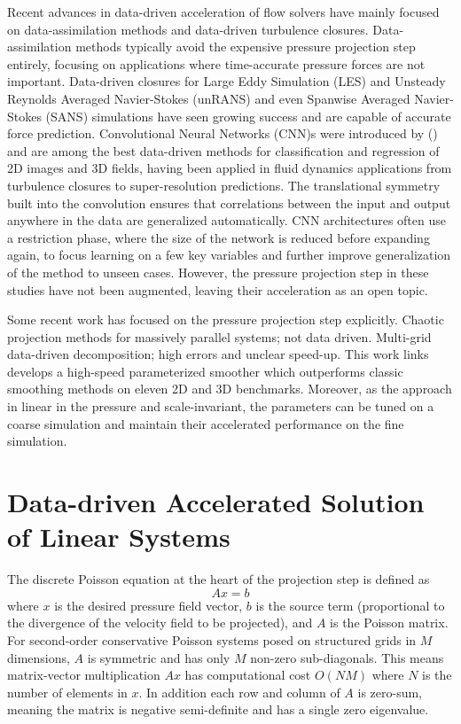 \documentclass[review]{elsarticle}
\begin{document}
Recent advances in data-driven acceleration of flow solvers have mainly focused on data-assimilation methods and data-driven turbulence closures. Data-assimilation methods typically avoid the expensive pressure projection step entirely, focusing on applications where time-accurate pressure forces are not important. Data-driven closures for Large Eddy Simulation (LES) and Unsteady Reynolds Averaged Navier-Stokes (unRANS) and even Spanwise Averaged Navier-Stokes (SANS) simulations have seen growing success and are capable of accurate force prediction. Convolutional Neural Networks (CNN)s were introduced by () and are among the best data-driven methods for classification and regression of 2D images and 3D fields, having been applied in fluid dynamics applications from turbulence closures to super-resolution predictions. The translational symmetry built into the convolution ensures that correlations between the input and output anywhere in the data are generalized automatically. CNN architectures often use a restriction phase, where the size of the network is reduced before expanding again, to focus learning on a few key variables and further improve generalization of the method to unseen cases. However, the pressure projection step in these studies have not been augmented, leaving their acceleration as an open topic.

Some recent work has focused on the pressure projection step explicitly. Chaotic projection methods for massively parallel systems; not data driven. Multi-grid data-driven decomposition; high errors and unclear speed-up. This work links develops a high-speed parameterized smoother which outperforms classic smoothing methods on eleven 2D and 3D benchmarks. Moreover, as the approach in linear in the pressure and scale-invariant, the parameters can be tuned on a coarse simulation and maintain their accelerated performance on the fine simulation. 

\section{Data-driven Accelerated Solution of Linear Systems}

The discrete Poisson equation at the heart of the projection step is defined as
\begin{equation}
    A x = b
\end{equation}
where $x$ is the desired pressure field vector, $b$ is the source term (proportional to the divergence of the velocity field to be projected), and $A$ is the Poisson matrix. For second-order conservative Poisson systems posed on structured grids in $M$ dimensions, $A$ is symmetric and has only $M$ non-zero sub-diagonals. This means matrix-vector multiplication $Ax$ has computational cost $O(NM)$ where $N$ is the number of elements in $x$. In addition each row and column of $A$ is zero-sum, meaning the matrix is negative semi-definite and has a single zero eigenvalue. 
\end{document}
